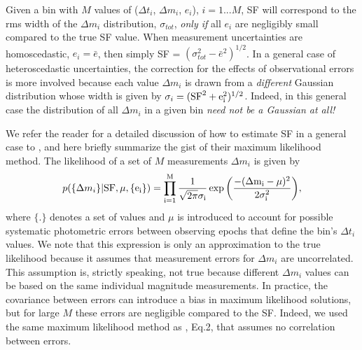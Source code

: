 \documentclass[fleqn,usenatbib]{mnras}
\begin{document}
Given a bin with $M$ values of ($\Delta t_i$, $\Delta m_i$, $e_i$), $i=1...M$, SF will correspond to the rms width
of the $\Delta m_i$ distribution, $\sigma_{tot}$, {\it only if} all $e_i$ are negligibly small compared to the true SF 
value. When measurement uncertainties are homoscedastic, $e_i = \bar{e}$, then simply SF = $(\sigma_{tot}^2
- \bar{e}^2)^{1/2}$. In a general case of heteroscedastic uncertainties, the correction for the effects of 
observational errors is more involved because each value $\Delta m_i$ is drawn from a {\it different}
Gaussian distribution whose width is given by $\sigma_i  = (\rm{SF}^2 + e_i^2)^{1/2}$. Indeed, in this general 
case the distribution of all $\Delta m_i$ in a given bin {\it need not be a Gaussian at all!}

We refer the reader for a detailed discussion of how to estimate SF in a general case to \cite{ivezic2014}, 
and here briefly summarize the gist of their maximum likelihood method. The likelihood of a set of $M$
measurements $\Delta m_i$ is given by 
\begin{equation}
\label{eq:L}
p(\{\Delta m_{i}\} | \rm{SF}, \mu, \{e_{i}\} ) = 
 \prod _{i=1}^{M} { \frac{1}{\sqrt{2\pi} \sigma_i} \exp{\left( \frac{-(\Delta m_{i}-\mu)^{2}}{2\sigma_i^{2}} \right)}},
\end{equation}
where $\{.\}$ denotes a set of values and $\mu$ is introduced to account for possible systematic photometric 
errors between observing epochs that define the bin's $\Delta t_i$ values. We note that this expression is only 
an approximation to the true likelihood because it assumes that measurement errors for $\Delta m_i$ are 
uncorrelated. This assumption is, strictly speaking, not true because different $\Delta m_i$ values can be 
based on the same individual magnitude measurements. In practice, the covariance between errors can introduce a bias in maximum likelihood solutions, but for large $M$ these errors are negligible compared to the SF. Indeed, we used the same maximum likelihood method as \cite{schmidt2010}, Eq.2, that assumes no correlation between errors. 
\end{document}
